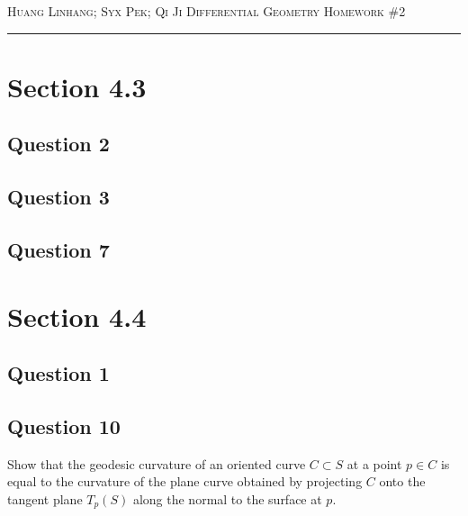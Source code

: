 \documentclass[12pt]{article}
\begin{document}
\thispagestyle{empty}

{\scshape Huang Linhang; Syx Pek; Qi Ji} \hfill {\scshape \large Differential Geometry} \hfill {\scshape Homework \#2}
 
\smallskip
\hrule
\bigskip

\section*{Section 4.3}
\subsection*{Question 2}

\subsection*{Question 3}

\subsection*{Question 7}

\section*{Section 4.4}
\subsection*{Question 1}

\subsection*{Question 10}
Show that the geodesic curvature of an oriented curve $C \subset S$ at a point $p \in C$ is equal to the curvature of the plane curve obtained by projecting $C$ onto the tangent plane $T_p(S)$ along the normal to the surface at $p$.\\
\end{document}
